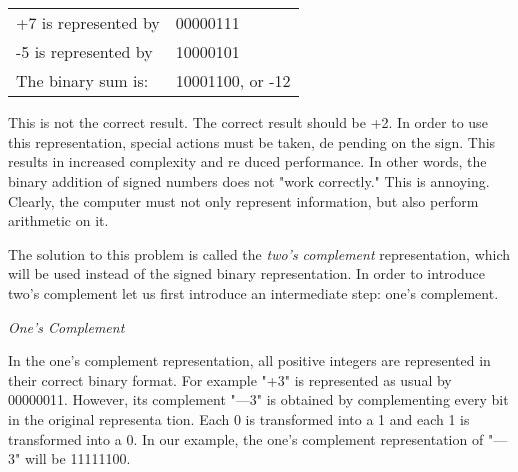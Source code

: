 \documentclass[12pt]{book}
\begin{document}
\\
\\
\begin{table}[H]
\begin{tabular}{ll}
+7 is represented by & 00000111         \\
-5 is represented by & 10000101         \\ \cline{2-2} 
The binary sum is:   & 10001100, or -12
\end{tabular}
\end{table}
This is not the correct result. The correct result should be +2. In order to use this representation, special actions must be taken, de pending on the sign. This results in increased complexity and re duced performance. In other words, the binary addition of signed numbers does not "work correctly." This is annoying. Clearly, the computer must not only represent information, but also perform arithmetic on it.

The solution to this problem is called the \textit{two's complement} representation, which will be used instead of the signed binary representation. In order to introduce two's complement let us first introduce an intermediate step: one's complement.

\noindent\textit{One's Complement}

In the one's complement representation, all positive integers are represented in their correct binary format. For example "+3" is represented as usual by 00000011. However, its complement "—3" is obtained by complementing every bit in the original representa tion. Each 0 is transformed into a 1 and each 1 is transformed into a 0. In our example, the one's complement representation of "—3" will be 11111100.
\end{document}

